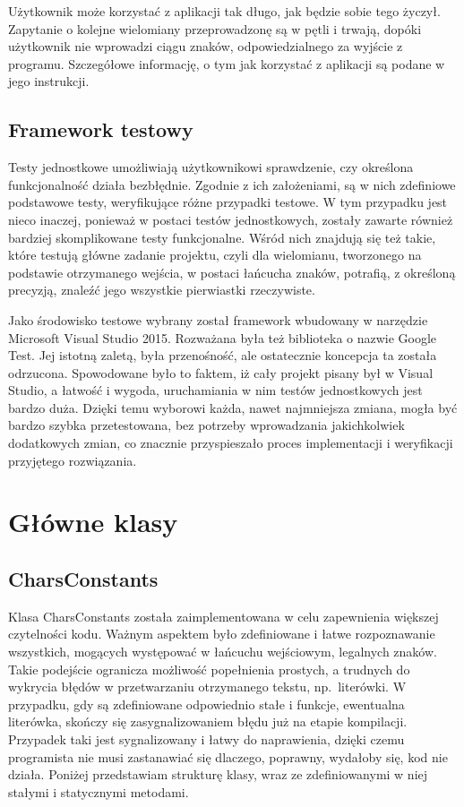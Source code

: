 \documentclass[oneside,a4paper]{book}
\begin{document}
	Użytkownik może korzystać z aplikacji tak długo, jak będzie sobie tego życzył. Zapytanie o kolejne wielomiany przeprowadzonę są w pętli i trwają, dopóki użytkownik nie wprowadzi ciągu znaków, odpowiedzialnego za wyjście z programu. Szczegółowe informację, o tym jak korzystać z aplikacji są podane w jego instrukcji.
	
	\subsection{Framework testowy}
	Testy jednostkowe umożliwiają użytkownikowi sprawdzenie, czy określona funkcjonalność działa bezbłędnie. Zgodnie z ich założeniami, są w nich zdefiniowe podstawowe testy, weryfikujące różne przypadki testowe. W tym przypadku jest nieco inaczej, ponieważ w postaci testów jednostkowych, zostały zawarte również bardziej skomplikowane testy funkcjonalne. Wśród nich znajdują się też takie, które testują główne zadanie projektu, czyli dla wielomianu, tworzonego na podstawie otrzymanego wejścia, w postaci łańcucha znaków, potrafią, z określoną precyzją, znaleźć jego wszystkie pierwiastki rzeczywiste.
	
	Jako środowisko testowe wybrany został framework wbudowany w narzędzie Microsoft Visual Studio 2015. Rozważana była też biblioteka o nazwie Google Test. Jej istotną zaletą, była przenośność, ale ostatecznie koncepcja ta została odrzucona. Spowodowane było to faktem, iż cały projekt pisany był w Visual Studio, a łatwość i wygoda, uruchamiania w nim testów jednostkowych jest bardzo duża. Dzięki temu wyborowi każda, nawet najmniejsza zmiana, mogła być bardzo szybka przetestowana, bez potrzeby wprowadzania jakichkolwiek dodatkowych zmian, co znacznie przyspieszało proces implementacji i weryfikacji przyjętego rozwiązania.
	
	\section{Główne klasy}
	
	\subsection{CharsConstants}
	
	Klasa CharsConstants została zaimplementowana w celu zapewnienia większej czytelności kodu. Ważnym aspektem było zdefiniowane i łatwe rozpoznawanie wszystkich, mogących występować w łańcuchu wejściowym, legalnych znaków. Takie podejście ogranicza możliwość popełnienia prostych, a trudnych do wykrycia błędów w przetwarzaniu otrzymanego tekstu, np.\ literówki. W przypadku, gdy są zdefiniowane odpowiednio stałe i funkcje, ewentualna literówka, skończy się zasygnalizowaniem błędu już na etapie kompilacji. Przypadek taki jest sygnalizowany i łatwy do naprawienia, dzięki czemu programista nie musi zastanawiać się dlaczego, poprawny, wydałoby się, kod nie działa. Poniżej przedstawiam strukturę klasy, wraz ze zdefiniowanymi w niej stałymi i statycznymi metodami. 
	
\end{document}
